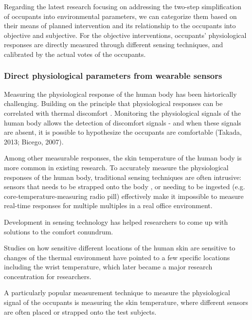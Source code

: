 Regarding the latest research focusing on addressing the two-step simplification of occupants into environmental parameters, we can categorize them based on their means of planned intervention and its relationship to the occupants into objective and subjective. For the objective interventions, occupants' physiological responses are directly measured through different sensing techniques, and calibrated by the actual votes of the occupants. 

\subsubsection{Direct physiological parameters from wearable sensors}
Measuring the physiological response of the human body has been historically challenging. Building on the principle that physiological responses can be correlated with thermal discomfort \cite{huizenga_skin_2004}. Monitoring the physiological signals of the human body allows the detection of discomfort signals - and when these signals are absent, it is possible to hypothesize the occupants are comfortable (Takada, 2013; Bicego, 2007). 


Among other measurable responses, the skin temperature of the human body is more common in existing research. To accurately measure the physiological responses of the human body, traditional sensing techniques are often intrusive: sensors that needs to be strapped onto the body \cite{mccarthy_validation_2016}, or needing to be ingested (e.g. core-temperature-measuring radio pill) effectively make it impossible to measure real-time responses for multiple multiples in a real office environment. 

Development in sensing technology has helped researchers to come up with solutions to the comfort conundrum. 

Studies on how sensitive different locations of the human skin are sensitive to changes of the thermal environment have pointed to a few specific locations including the wrist temperature, which later became a major research concentration for researchers\cite{choi_cobi:_2010}. 

A particularly popular measurement technique to measure the physiological signal of the occupants is measuring the skin temperature, where different sensors are often placed or strapped onto the test subjects\cite{liu_personal_2019}. 

